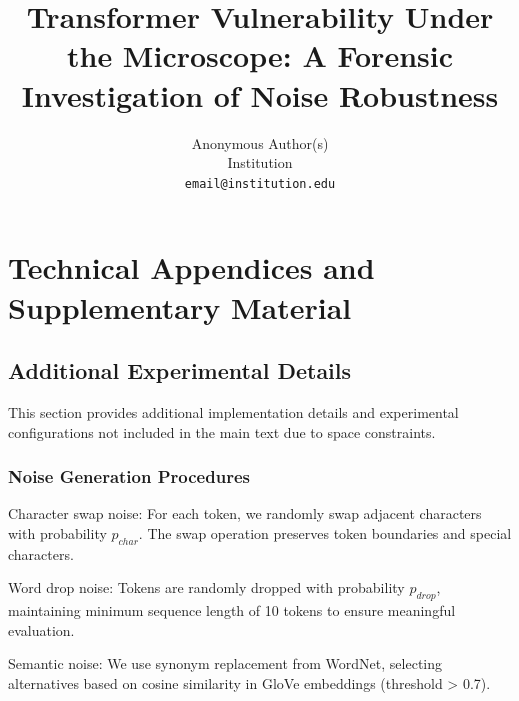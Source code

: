 \documentclass{article}
\title{Transformer Vulnerability Under the Microscope: A Forensic Investigation of Noise Robustness}
\author{%
  Anonymous Author(s)\\
  Institution\\
  \texttt{email@institution.edu}
}
\begin{document}
\maketitle



















\appendix

\section{Technical Appendices and Supplementary Material}

\subsection{Additional Experimental Details}

This section provides additional implementation details and experimental configurations not included in the main text due to space constraints.

\subsubsection{Noise Generation Procedures}

Character swap noise: For each token, we randomly swap adjacent characters with probability $p_{char}$. The swap operation preserves token boundaries and special characters.

Word drop noise: Tokens are randomly dropped with probability $p_{drop}$, maintaining minimum sequence length of 10 tokens to ensure meaningful evaluation.

Semantic noise: We use synonym replacement from WordNet, selecting alternatives based on cosine similarity in GloVe embeddings (threshold > 0.7).
\end{document}
